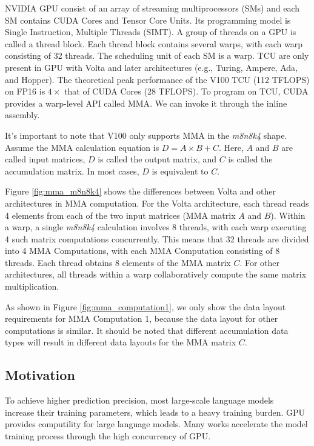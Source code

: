 \documentclass[10pt,twocolumn]{article}
\begin{document}
NVIDIA GPU consist of an array of streaming multiprocessors (SMs) and each SM contains CUDA Cores and Tensor Core Units. 
Its programming model is Single Instruction, Multiple Threads (SIMT). 
A group of threads on a GPU is called a thread block. 
Each thread block contains several warps, with each warp consisting of 32 threads. 
The scheduling unit of each SM is a warp.
TCU are only present in GPU with Volta and later architectures (e.g., Turing\cite{turing}, Ampere\cite{ampere}, Ada\cite{ada}, and Hopper\cite{hopper}). 
The theoretical peak performance of the V100 TCU (112 TFLOPS) on FP16 is $4\times$ that of CUDA Cores (28 TFLOPS).
To program on TCU, CUDA provides a warp-level API called MMA\cite{ptx}.
We can invoke it through the inline assembly.

It's important to note that V100 only supports MMA in the \textit{m8n8k4} shape. 
Assume the MMA calculation equation is $D=A \times B + C$. Here, $A$ and $B$ are called input matrices, $D$ is called the output matrix, and $C$ is called the accumulation matrix. 
In most cases, $D$ is equivalent to $C$. 

Figure \ref{fig:mma_m8n8k4} shows the differences between Volta and other architectures in MMA computation.
For the Volta architecture, each thread reads 4 elements from each of the two input matrices (MMA matrix $A$ and $B$). 
Within a warp, a single \textit{m8n8k4} calculation involves 8 threads, with each warp executing 4 such matrix computations concurrently. 
This means that 32 threads are divided into 4 MMA Computations, with each MMA Computation consisting of 8 threads. 
Each thread obtains 8 elements of the MMA matrix $C$.
For other architectures, all threads within a warp collaboratively compute the same matrix multiplication.

As shown in Figure \ref{fig:mma_computation1}, we only show the data layout requirements for MMA Computation 1, because the data layout for other computations is similar.
It should be noted that different accumulation data types will result in different data layouts for the MMA matrix $C$.

\subsection{Motivation}
To achieve higher prediction precision, most large-scale language models ~\cite{devlin2018bert,brown2020language,raffel2020exploring,liu2019roberta,yang2019xlnet,clark2020electra,radford2019language} increase their training parameters, which leads to a heavy training burden. 
GPU provides computility for large language models.
Many works accelerate the model training process through the high concurrency of GPU.
\end{document}
